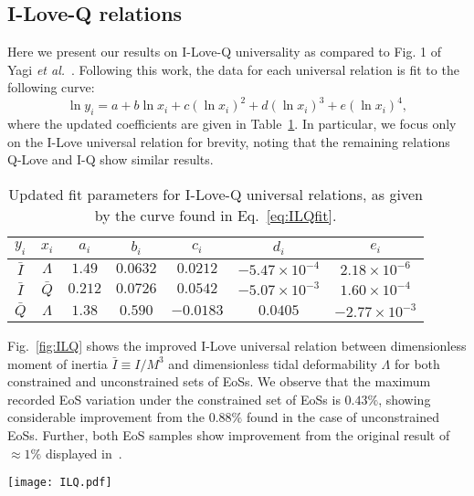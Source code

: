 \documentclass[prd,twocolumn,nofootinbib,superscriptaddress,amsmath,amssymb]{revtex4-1}
\begin{document}
\subsection{I-Love-Q relations}\label{sec:ilq}
Here we present our results on I-Love-Q universality as compared to Fig. 1 of Yagi \textit{et al.}~\cite{Yagi:ILQ}.
Following this work, the data for each universal relation is fit to the following curve:
\begin{equation}\label{eq:ILQfit}
\ln{y_i}=a+b \ln{x_i} + c (\ln{x_i})^2 + d (\ln{x_i})^3 + e (\ln{x_i})^4,
\end{equation}
where the updated coefficients are given in Table~\ref{tab:ILQfit}.
In particular, we focus only on the I-Love universal relation for brevity, noting that the remaining relations Q-Love and I-Q show similar results.

\begin{table}[ht!]
\centering
\caption{
Updated fit parameters for I-Love-Q universal relations, as given by the curve found in Eq.~\ref{eq:ILQfit}.
}\label{tab:ILQfit}
\begin{tabular}{ c  c | c c c c c } 
 \hline
 \hline
 $y_i$ & $x_i$ & $a_i$ & $b_i$ & $c_i$ & $d_i$ & $e_i$ \\
 \hline
 $\bar{I}$ & $\Lambda$ & $1.49$ & $0.0632$ & $0.0212$ & $-5.47 \times 10^{-4}$ & $2.18 \times 10^{-6}$ \\
 $\bar{I}$ & $\bar{Q}$ & $0.212$ & $0.0726$ & $0.0542$ & $-5.07 \times 10^{-3}$ & $1.60 \times 10^{-4}$ \\
 $\bar{Q}$ & $\Lambda$ & $1.38$ & $0.590$ & $-0.0183$ & $0.0405$ & $-2.77 \times 10^{-3}$ \\ 
 \hline
 \hline
\end{tabular}
\end{table}

Fig.~\ref{fig:ILQ} shows the improved I-Love universal relation between dimensionless moment of inertia $\bar{I} \equiv I/M^3$ and dimensionless tidal deformability $\Lambda$ for both constrained and unconstrained sets of EoSs.
We observe that the maximum recorded EoS variation under the constrained set of EoSs is $0.43\%$, showing considerable improvement from the $0.88\%$ found in the case of unconstrained EoSs.
Further, both EoS samples show improvement from the original result of $\approx 1\%$ displayed in~\cite{Yagi:ILQ}.
\begin{figure*}
\begin{center} 
\texttt{[image: ILQ.pdf]}
\end{center}
\caption{
I-Love universal relations shown for the constrained EoSs (left) and unconstrained EoSs (right).
In this figure, the black line corresponds to the fit given by Eq.~\ref{eq:ILQfit}, while all other colors correspond to the 35 EoSs used in each case.
The maximal EoS variation from the fit for unconstrained EoSs is $0.88\%$, which is comparable to the $1\%$ found in~\cite{Yagi:ILQ}.
The constrained EoSs on the other hand, are universal to $0.43\%$, showing considerable improvement upon previous analyses.
}
\label{fig:ILQ}
\end{figure*} 
\end{document}
